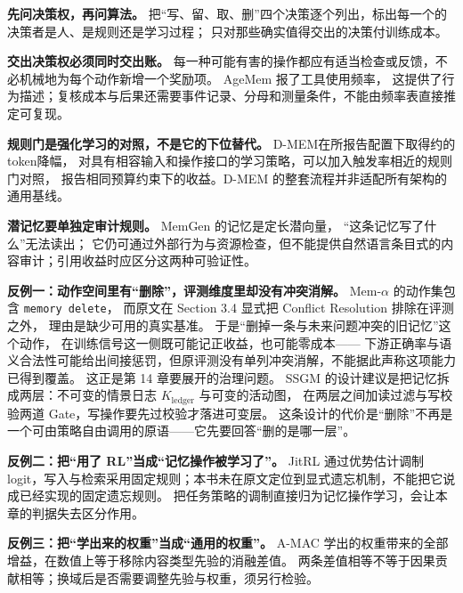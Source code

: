 \begin{principlebox}
\textbf{先问决策权，再问算法。}
把“写、留、取、删”四个决策逐个列出，标出每一个的决策者是人、是规则还是学习过程；
只对那些确实值得交出的决策付训练成本。

\textbf{交出决策权必须同时交出账。}
每一种可能有害的操作都应有适当检查或反馈，不必机械地为每个动作新增一个奖励项。
AgeMem 报了工具使用频率\cite{agemem-2601}，
这提供了行为描述；复核成本与后果还需要事件记录、分母和测量条件，不能由频率表直接推定可复现。

\textbf{规则门是强化学习的对照，不是它的下位替代。}
D-MEM在所报告配置下取得约的token降幅\cite{dmem-2603}，
对具有相容输入和操作接口的学习策略，可以加入触发率相近的规则门对照，
报告相同预算约束下的收益。D-MEM 的整套流程并非适配所有架构的通用基线。

\textbf{潜记忆要单独定审计规则。}
MemGen 的记忆是定长潜向量\cite{memgen-2509}，
“这条记忆写了什么”无法读出；
它仍可通过外部行为与资源检查，但不能提供自然语言条目式的内容审计；引用收益时应区分这两种可验证性。
\end{principlebox}

\begin{pitfallbox}
\textbf{反例一：动作空间里有“删除”，评测维度里却没有冲突消解。}
Mem-$\alpha$ 的动作集包含 \texttt{memory delete}，
而原文在 Section 3.4 显式把 Conflict Resolution 排除在评测之外，
理由是缺少可用的真实基准\cite{memalpha-2509}。
于是“删掉一条与未来问题冲突的旧记忆”这个动作，
在训练信号这一侧既可能记正收益，也可能零成本——
下游正确率与语义合法性可能给出间接惩罚，但原评测没有单列冲突消解，不能据此声称这项能力已得到覆盖。
这正是第 14 章要展开的治理问题。
SSGM 的设计建议是把记忆拆成两层：不可变的情景日志 $K_{\text{ledger}}$ 与可变的活动图，
在两层之间加读过滤与写校验两道 Gate，写操作要先过校验才落进可变层\cite{ssgm-2603}。
这条设计的代价是“删除”不再是一个可由策略自由调用的原语——它先要回答“删的是哪一层”。

\textbf{反例二：把“用了 RL”当成“记忆操作被学习了”。}
JitRL 通过优势估计调制 logit，写入与检索采用固定规则；本书未在原文定位到显式遗忘机制，不能把它说成已经实现的固定遗忘规则\cite{jitrl-2601}。
把任务策略的调制直接归为记忆操作学习，会让本章的判据失去区分作用。

\textbf{反例三：把“学出来的权重”当成“通用的权重”。}
A-MAC 学出的权重带来的全部增益，在数值上等于移除内容类型先验的消融差值\cite{amac-2603}。
两条差值相等不等于因果贡献相等；换域后是否需要调整先验与权重，须另行检验。
\end{pitfallbox}

